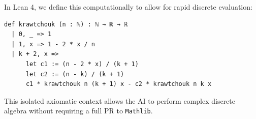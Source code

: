 In Lean 4, we define this computationally to allow for rapid discrete evaluation:

\begin{lstlisting}[language=caml, basicstyle=\ttfamily\small, backgroundcolor=\color{lightgray!20}]
def krawtchouk (n : ℕ) : ℕ → ℝ → ℝ
  | 0, _ => 1
  | 1, x => 1 - 2 * x / n
  | k + 2, x =>
      let c1 := (n - 2 * x) / (k + 1)
      let c2 := (n - k) / (k + 1)
      c1 * krawtchouk n (k + 1) x - c2 * krawtchouk n k x
\end{lstlisting}

This isolated axiomatic context allows the AI to perform complex discrete algebra without requiring a full PR to \texttt{Mathlib}.
